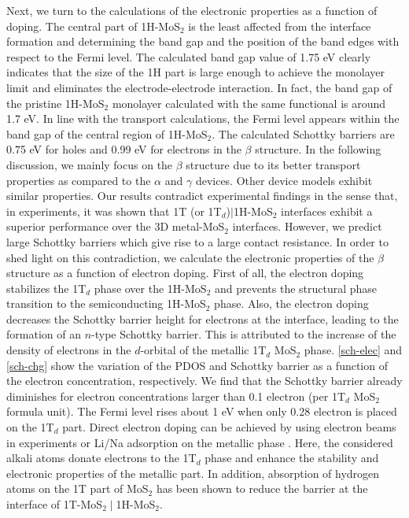 Next, we turn to the calculations of the electronic properties as a function of doping.
The central part of 1H-MoS$_2$ is the least affected from the interface formation and determining the band gap and the position of the band edges with respect to the Fermi level. The calculated band gap value of 1.75 eV clearly indicates that the size of the 1H part is large enough to achieve the monolayer limit and eliminates the electrode-electrode interaction. 
In fact, the band gap of the pristine 1H-MoS$_2$ monolayer calculated with the same functional is around 1.7 eV. 
In line with the transport calculations, the Fermi level appears within the band gap of the central region of 1H-MoS$_2$. The calculated Schottky barriers are 0.75 eV for holes and 0.99 eV for electrons in the $\beta$ structure. In the following discussion, we mainly focus on the $\beta$ structure due to its better transport properties as compared to the  $\alpha$ and  $\gamma$ devices. Other device models exhibit similar properties. Our results contradict experimental findings in the sense that, in experiments, it was shown that 1T (or 1T$_d$)$\mid$1H-MoS$_2$ interfaces exhibit a superior performance over the 3D metal-MoS$_2$ interfaces. However, we predict large Schottky barriers which give rise to a large contact resistance. In order to shed light on this contradiction, we calculate the electronic properties of the $\beta$ structure as a function of electron doping.   First of all, the electron doping stabilizes the 1T$_d$ phase over the 1H-MoS$_2$ and prevents the structural phase transition to the semiconducting 1H-MoS$_2$ phase\cite{doi:10.1021/jp4076355}. Also, the electron doping decreases the Schottky barrier height for electrons at the interface, leading to the formation of an $n$-type Schottky barrier. This is attributed to the increase of the density of electrons in the $d$-orbital of the metallic 1T$_d$ MoS$_2$ phase. \autoref{sch-elec} and \autoref{sch-chg} show the variation of the PDOS and Schottky barrier as a function of the electron concentration, respectively. We find that the Schottky barrier already diminishes for electron concentrations larger than 0.1 electron (per 1T$_d$ MoS$_2$ formula unit). The Fermi level rises about 1 eV when only 0.28 electron is placed on the 1T$_d$ part. Direct electron doping can be achieved by using electron beams in experiments or Li/Na adsorption on the metallic phase\cite{doi:10.1021/acs.nanolett.6b01186,doi:10.1021/jp4076355} . Here, the considered alkali atoms donate electrons to the 1T$_d$ phase and enhance the stability and electronic properties of the metallic part\cite{doi:10.1021/jp4076355}. In addition, absorption of hydrogen atoms on the 1T part of MoS$_2$ has been shown to reduce the barrier at the interface of 1T-MoS$_2\mid$1H-MoS$_2$\cite{doi:10.1021/acs.nanolett.6b03999,doi:10.1021/acs.chemmater.5b00986}. 

